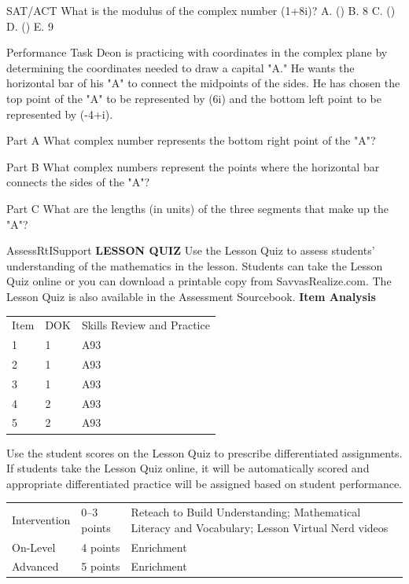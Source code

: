 \documentclass{article}
\newenvironment{practice}[2]{}{}        %
\newenvironment{te-addendum}[2]{}{}     %
\newcommand{\answer}[1]{}               %
\newcommand{\placeholder}[2]{}          %
\newcommand{\te}[1]{}                   %
\begin{document}
\begin{practice}{35}{1}
SAT/ACT What is the modulus of the complex number (1+8i)?
A. ()
B. 8
C. ()
D. ()
E. 9
\answer{C}
\end{practice}
\begin{practice}{36}{3}
Performance Task Deon is practicing with coordinates in the complex plane by determining the coordinates needed to draw a capital "A." He wants the horizontal bar of his "A" to connect the midpoints of the sides. He has chosen the top point of the "A" to be represented by (6i) and the bottom left point to be represented by (-4+i).
\placeholder{illustration}{White note with curled lower right corner, small capital A centered, no coordinate grid or labels.}
Part A What complex number represents the bottom right point of the "A"?
\answer{Part A (4+i)}
Part B What complex numbers represent the points where the horizontal bar connects the sides of the "A"?
\answer{Part B (-2+3.5i) and (2+3.5i)}
Part C What are the lengths (in units) of the three segments that make up the "A"?
\answer{Part C The segments have lengths (\sqrt{41}) units, (\sqrt{41}) units, and 4 units.}
\end{practice}
\begin{te-addendum}{Assess}{RtISupport}
\textbf{LESSON QUIZ}
Use the Lesson Quiz to assess students' understanding of the mathematics in the lesson.
Students can take the Lesson Quiz online or you can download a printable copy from SavvasRealize.com. The Lesson Quiz is also available in the Assessment Sourcebook.
\textbf{Item Analysis}
\begin{tabular}{lll}
Item & DOK & Skills Review and Practice \\
1 & 1 & A93 \\
2 & 1 & A93 \\
3 & 1 & A93 \\
4 & 2 & A93 \\
5 & 2 & A93 \\
\end{tabular}
Use the student scores on the Lesson Quiz to prescribe differentiated assignments.
If students take the Lesson Quiz online, it will be automatically scored and appropriate differentiated practice will be assigned based on student performance.
\begin{tabular}{lll}
Intervention & 0--3 points & Reteach to Build Understanding; Mathematical Literacy and Vocabulary; Lesson Virtual Nerd videos \\
On-Level & 4 points & Enrichment \\
Advanced & 5 points & Enrichment \\
\end{tabular}
\te{Assessment. Lesson Quiz is available at SavvasRealize.com.}
\end{te-addendum}
\end{document}
